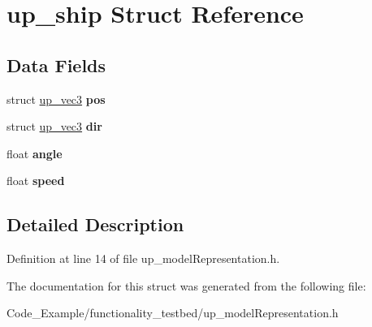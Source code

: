 \hypertarget{structup__ship}{}\section{up\+\_\+ship Struct Reference}
\label{structup__ship}
\subsection*{Data Fields}
\begin{DoxyCompactItemize}
\item 
\hypertarget{structup__ship_ad5e9d1040f4ef4fbe488b7078c16ee97}{}struct \hyperlink{structup__vec3}{up\+\_\+vec3} {\bfseries pos}\label{structup__ship_ad5e9d1040f4ef4fbe488b7078c16ee97}

\item 
\hypertarget{structup__ship_a7dae79773a11a548af899bb8b0bc74a0}{}struct \hyperlink{structup__vec3}{up\+\_\+vec3} {\bfseries dir}\label{structup__ship_a7dae79773a11a548af899bb8b0bc74a0}

\item 
\hypertarget{structup__ship_ab8ef1bf8a70cc07c6d55823c390a7e76}{}float {\bfseries angle}\label{structup__ship_ab8ef1bf8a70cc07c6d55823c390a7e76}

\item 
\hypertarget{structup__ship_a7f7e4724cf57d59513b39c5ecc81adc8}{}float {\bfseries speed}\label{structup__ship_a7f7e4724cf57d59513b39c5ecc81adc8}

\end{DoxyCompactItemize}


\subsection{Detailed Description}


Definition at line 14 of file up\+\_\+model\+Representation.\+h.



The documentation for this struct was generated from the following file\+:\begin{DoxyCompactItemize}
\item 
Code\+\_\+\+Example/functionality\+\_\+testbed/up\+\_\+model\+Representation.\+h\end{DoxyCompactItemize}
